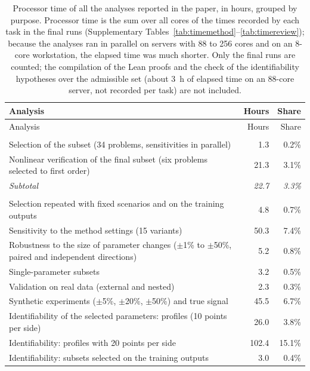 \begin{longtable}{@{}>{\raggedright\arraybackslash}p{11.2cm}rr@{}}
\caption{Processor time of all the analyses reported in the paper, in hours, grouped by purpose. Processor time is the sum over all cores of the times recorded by each task in the final runs (Supplementary Tables~\ref{tab:timemethod}--\ref{tab:timereview}); because the analyses ran in parallel on servers with 88 to 256 cores and on an 8-core workstation, the elapsed time was much shorter. Only the final runs are counted; the compilation of the Lean proofs and the check of the identifiability hypotheses over the admissible set (about 3~h of elapsed time on an 88-core server, not recorded per task) are not included.}\label{tab:timebreakdown}\\
\toprule
Analysis & Hours & Share \\
\midrule
\endfirsthead
\toprule
Analysis & Hours & Share \\
\midrule
\endhead
\multicolumn{3}{@{}l}{\textbf{The method itself}} \\
\quad Selection of the subset (34 problems, sensitivities in parallel) & 1.3 & 0.2\% \\
\quad Nonlinear verification of the final subset (six problems selected to first order) & 21.3 & 3.1\% \\
\quad \emph{Subtotal} & \emph{22.7} & \emph{3.3\%} \\
\addlinespace
\multicolumn{3}{@{}l}{\textbf{Evaluation of the method}} \\
\quad Selection repeated with fixed scenarios and on the training outputs & 4.8 & 0.7\% \\
\quad Sensitivity to the method settings (15 variants) & 50.3 & 7.4\% \\
\quad Robustness to the size of parameter changes ($\pm$1\% to $\pm$50\%, paired and independent directions) & 5.2 & 0.8\% \\
\quad Single-parameter subsets & 3.2 & 0.5\% \\
\quad Validation on real data (external and nested) & 2.3 & 0.3\% \\
\quad Synthetic experiments ($\pm$5\%, $\pm$20\%, $\pm$50\%) and true signal & 45.5 & 6.7\% \\
\quad Identifiability of the selected parameters: profiles (10 points per side) & 26.0 & 3.8\% \\
\quad Identifiability: profiles with 20 points per side & 102.4 & 15.1\% \\
\quad Identifiability: subsets selected on the training outputs & 3.0 & 0.4\% \\

\end{longtable}
